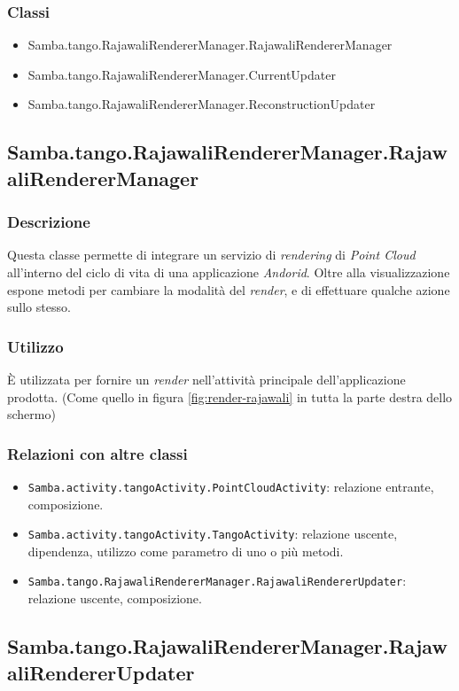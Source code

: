 \subsubsection{Classi}
\begin{itemize}
	\item Samba.tango.RajawaliRendererManager.RajawaliRendererManager
	\item Samba.tango.RajawaliRendererManager.CurrentUpdater
	\item Samba.tango.RajawaliRendererManager.ReconstructionUpdater
\end{itemize}


\subsection{Samba.tango.RajawaliRendererManager.RajawaliRendererManager}
\subsubsection{Descrizione}
Questa classe permette di integrare un servizio di \emph{rendering} di \emph{Point Cloud} all'interno del ciclo di vita di una applicazione \emph{Andorid}. Oltre alla visualizzazione espone metodi per cambiare la modalità del \emph{render}, e di effettuare qualche azione sullo stesso.
\subsubsection{Utilizzo}
È utilizzata per fornire un \emph{render} nell'attività principale dell'applicazione prodotta. (Come quello in figura \ref{fig:render-rajawali} in tutta la parte destra dello schermo)
\subsubsection{Relazioni con altre classi}
\begin{itemize}
	\item \texttt{Samba.activity.tangoActivity.PointCloudActivity}: relazione entrante, composizione.
	\item \texttt{Samba.activity.tangoActivity.TangoActivity}: relazione uscente, dipendenza, utilizzo come parametro di uno o più metodi.
	\item \texttt{Samba.tango.RajawaliRendererManager.RajawaliRendererUpdater}: relazione uscente, composizione.
\end{itemize}

\subsection{Samba.tango.RajawaliRendererManager.RajawaliRendererUpdater}
